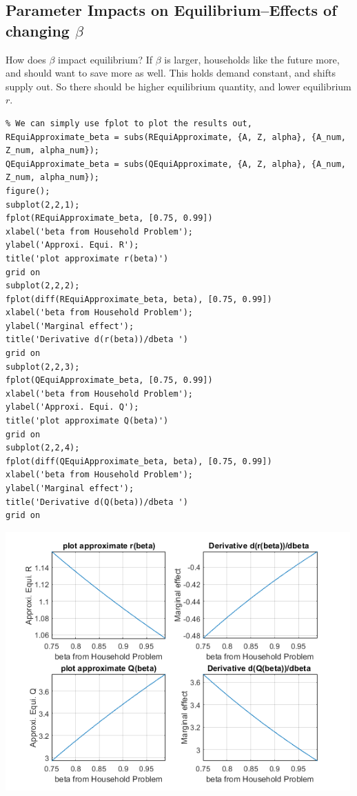 \documentclass[
]{book}
\begin{document}
\hypertarget{parameter-impacts-on-equilibriumeffects-of-changing-beta}{%
\subsection{\texorpdfstring{Parameter Impacts on Equilibrium--Effects of changing \(\beta\)}{Parameter Impacts on Equilibrium--Effects of changing \textbackslash beta}}\label{parameter-impacts-on-equilibriumeffects-of-changing-beta}}

How does \(\beta\) impact equilibrium? If \(\beta\) is larger, households
like the future more, and should want to save more as well. This holds
demand constant, and shifts supply out. So there should be higher
equilibrium quantity, and lower equilibrium \(r\).

\begin{verbatim}
% We can simply use fplot to plot the results out, 
REquiApproximate_beta = subs(REquiApproximate, {A, Z, alpha}, {A_num, Z_num, alpha_num});
QEquiApproximate_beta = subs(QEquiApproximate, {A, Z, alpha}, {A_num, Z_num, alpha_num});
figure();
subplot(2,2,1);
fplot(REquiApproximate_beta, [0.75, 0.99])
xlabel('beta from Household Problem');
ylabel('Approxi. Equi. R');
title('plot approximate r(beta)')
grid on
subplot(2,2,2);
fplot(diff(REquiApproximate_beta, beta), [0.75, 0.99])
xlabel('beta from Household Problem');
ylabel('Marginal effect');
title('Derivative d(r(beta))/dbeta ')
grid on
subplot(2,2,3);
fplot(QEquiApproximate_beta, [0.75, 0.99])
xlabel('beta from Household Problem');
ylabel('Approxi. Equi. Q');
title('plot approximate Q(beta)')
grid on
subplot(2,2,4);
fplot(diff(QEquiApproximate_beta, beta), [0.75, 0.99])
xlabel('beta from Household Problem');
ylabel('Marginal effect');
title('Derivative d(Q(beta))/dbeta ')
grid on
\end{verbatim}

\includegraphics[width=5.20833in,height=\textheight]{img/demand_supply_taylor_approximate_capital_images/figure_3.png}
\end{document}
